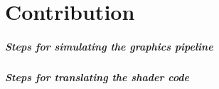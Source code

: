 
\chapter{Contribution}\label{cha:Contribution}

\paragraph{Steps for simulating the graphics pipeline}

\paragraph{Steps for translating the shader code}
